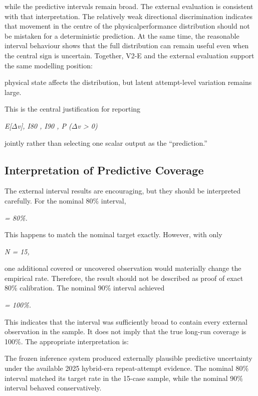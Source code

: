 while the predictive intervals remain broad. The external evaluation is consistent with that interpretation. The relatively weak directional discrimination indicates that movement in the centre of the physicalperformance distribution should not be mistaken for a deterministic prediction. At the same time, the reasonable interval behaviour shows that the full distribution can remain useful even when the central sign is uncertain. Together, V2-E and the external evaluation support the same modelling position:

physical state affects the distribution, but latent attempt-level variation remains large.

This is the central justification for reporting

\begin{center}\textit{E[\ensuremath{\Delta}v],       I80 ,       I90 ,   P (\ensuremath{\Delta}v > 0)}\end{center}

jointly rather than selecting one scalar output as the ``prediction.''

\subsection{Interpretation of Predictive Coverage}
The external interval results are encouraging, but they should be interpreted carefully. For the nominal 80\% interval,

\begin{center}\textit{= 80\%.}\end{center}

This happens to match the nominal target exactly. However, with only

\begin{center}\textit{N = 15,}\end{center}

one additional covered or uncovered observation would materially change the empirical rate. Therefore, the result should not be described as proof of exact 80\% calibration. The nominal 90\% interval achieved

\begin{center}\textit{= 100\%.}\end{center}

This indicates that the interval was sufficiently broad to contain every external observation in the sample. It does not imply that the true long-run coverage is 100\%. The appropriate interpretation is:

The frozen inference system produced externally plausible predictive uncertainty under the available 2025 hybrid-era repeat-attempt evidence. The nominal 80\% interval matched its target rate in the 15-case sample, while the nominal 90\% interval behaved conservatively.


